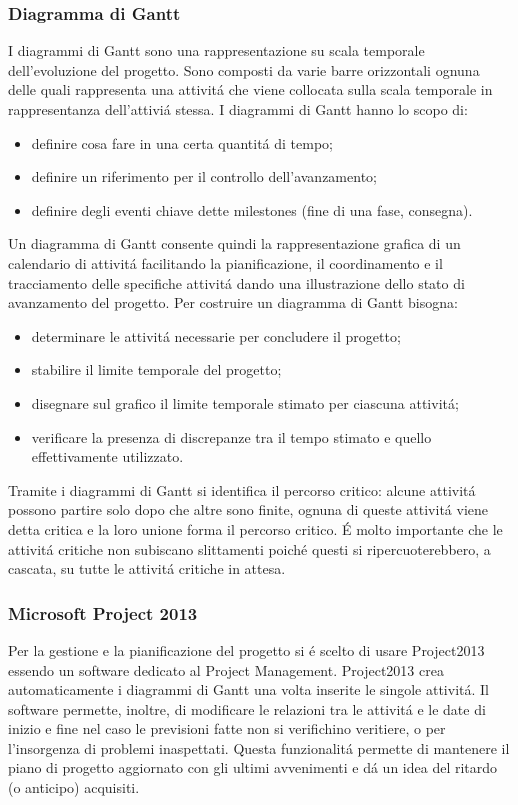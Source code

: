 \subsubsection{Diagramma di Gantt}

I diagrammi di Gantt sono una rappresentazione su scala temporale dell'evoluzione del
progetto. Sono composti da varie barre orizzontali ognuna delle quali rappresenta una
attivit\'a che viene collocata sulla scala temporale in rappresentanza dell'attivi\'a stessa.
I diagrammi di Gantt hanno lo scopo di:
\begin{itemize}
\item definire cosa fare in una certa quantit\'a di tempo;
\item definire un riferimento per il controllo dell'avanzamento;
\item  definire degli eventi chiave dette milestones (fine di una fase, consegna).
\end{itemize}
Un diagramma di Gantt consente quindi la rappresentazione grafica di un calendario di
attivit\'a facilitando la pianificazione, il coordinamento e il tracciamento delle specifiche
attivit\'a dando una illustrazione dello stato di avanzamento del progetto. Per costruire
un diagramma di Gantt bisogna:
\begin{itemize}
\item  determinare le attivit\'a necessarie per concludere il progetto;
\item  stabilire il limite temporale del progetto;
\item  disegnare sul grafico il limite temporale stimato per ciascuna attivit\'a;
\item  verificare la presenza di discrepanze tra il tempo stimato e quello effettivamente
utilizzato.
\end{itemize}
Tramite i diagrammi di Gantt si identifica il percorso critico: alcune attivit\'a possono
partire solo dopo che altre sono finite, ognuna di queste attivit\'a viene detta critica e la
loro unione forma il percorso critico. \'E molto importante che le attivit\'a critiche non
subiscano slittamenti poich\'e questi si ripercuoterebbero, a cascata, su tutte le attivit\'a
critiche in attesa.

\subsubsection{Microsoft Project 2013}
Per la gestione e la pianificazione del progetto si \'e scelto di usare Project2013 essendo
un software dedicato al Project Management. Project2013 
crea automaticamente i diagrammi di Gantt una volta inserite le singole attivit\'a. Il software permette, inoltre, di modificare
le relazioni tra le attivit\'a e le date di inizio e fine nel caso le previsioni fatte non si
verifichino veritiere, o per l'insorgenza di problemi inaspettati. Questa funzionalit\'a
permette di mantenere il piano di progetto aggiornato con gli ultimi avvenimenti e d\'a
un idea del ritardo (o anticipo) acquisiti.

